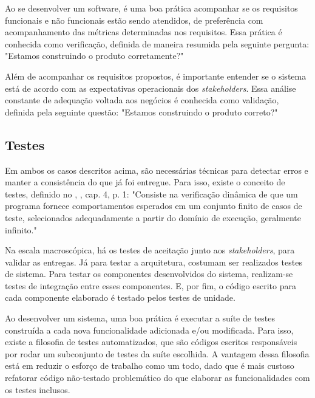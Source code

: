 Ao se desenvolver um software, é uma boa prática acompanhar se os requisitos funcionais e não funcionais estão sendo atendidos, de preferência com acompanhamento das métricas determinadas nos requisitos. Essa prática é conhecida como verificação, definida de maneira resumida pela seguinte pergunta\cite[cap. ~10, p. ~6]{ieeecomputersociety2014}: "Estamos construindo o produto corretamente?"

Além de acompanhar os requisitos propostos, é importante entender se o sistema está de acordo com as expectativas operacionais dos \textit{stakeholders}. Essa análise constante de adequação voltada aos negócios é conhecida como validação, definida pela seguinte questão\cite[cap. ~10, p. ~6]{ieeecomputersociety2014}: "Estamos construindo o produto correto?"

\subsection{Testes}
Em ambos os casos descritos acima, são necessárias técnicas para detectar erros e manter a consistência do que já foi entregue. Para isso, existe o conceito de testes, definido no \citeauthor{ieeecomputersociety2014}, \citeyear{ieeecomputersociety2014}, cap. 4, p. 1: "Consiste na verificação dinâmica de que um programa fornece comportamentos esperados em um conjunto finito de casos de teste, selecionados adequadamente a partir do domínio de execução, geralmente infinito."

Na escala macroscópica, há os testes de aceitação junto aos \textit{stakeholders}, para validar as entregas. Já para testar a arquitetura, costumam ser realizados testes de sistema. Para testar os componentes desenvolvidos do sistema, realizam-se testes de integração entre esses componentes. E, por fim, o código escrito para cada componente elaborado é testado pelos testes de unidade.

Ao desenvolver um sistema, uma boa prática é executar a suíte de testes construída a cada nova funcionalidade adicionada e/ou modificada. Para isso, existe a filosofia de testes automatizados, que são códigos escritos responsáveis por rodar um subconjunto de testes da suíte escolhida. A vantagem dessa filosofia está em reduzir o esforço de trabalho como um todo, dado que é mais custoso refatorar código não-testado problemático do que elaborar as funcionalidades com os testes inclusos\cite[cap. ~3, p. 19-21]{gerardmeszaros2007}.
